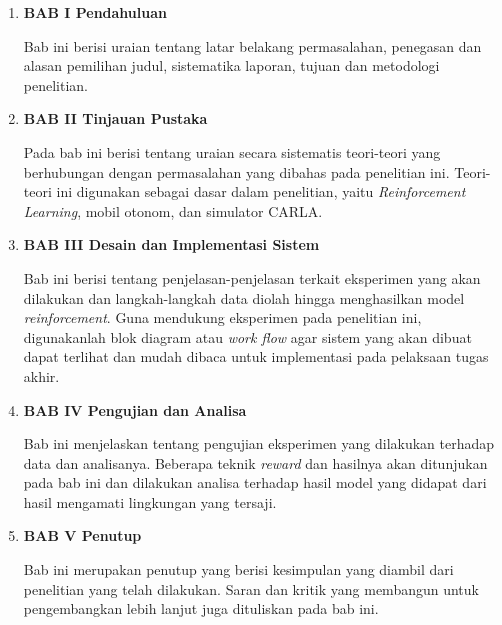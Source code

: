 \begin{enumerate}[nolistsep]

  \item \textbf{BAB I Pendahuluan}

  Bab ini berisi uraian tentang latar belakang permasalahan, penegasan dan alasan pemilihan judul, sistematika laporan, tujuan dan metodologi penelitian.

  \vspace{2ex}

  \item \textbf{BAB II Tinjauan Pustaka}

  Pada bab ini berisi tentang uraian secara sistematis teori-teori yang berhubungan dengan permasalahan yang dibahas pada penelitian ini. Teori-teori ini digunakan sebagai dasar dalam penelitian, yaitu \textit{Reinforcement Learning}, mobil otonom, dan simulator CARLA.

  \vspace{2ex}

  \item \textbf{BAB III Desain dan Implementasi Sistem}

  Bab ini berisi tentang penjelasan-penjelasan terkait eksperimen yang akan dilakukan dan langkah-langkah data diolah hingga menghasilkan model \textit{reinforcement}. Guna mendukung eksperimen pada penelitian ini, digunakanlah blok diagram atau \textit{work flow} agar sistem yang akan dibuat dapat terlihat dan mudah dibaca untuk implementasi pada pelaksaan tugas akhir.

  \vspace{2ex}

  \item \textbf{BAB IV Pengujian dan Analisa}

  Bab ini menjelaskan tentang pengujian eksperimen yang dilakukan terhadap data dan analisanya. Beberapa teknik \textit{reward} dan hasilnya akan ditunjukan pada bab ini dan dilakukan analisa terhadap hasil model yang didapat dari hasil mengamati lingkungan yang tersaji.

  \vspace{2ex}

  \item \textbf{BAB V Penutup}

  Bab ini merupakan penutup yang berisi kesimpulan yang diambil dari penelitian yang telah dilakukan. Saran dan kritik yang membangun untuk pengembangkan lebih lanjut juga dituliskan pada bab ini.

\end{enumerate}
